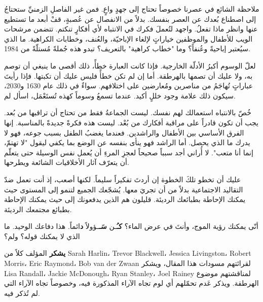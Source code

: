 \documentclass[a4paper]{article}%
\begin{document}
ملاحظة الشائع في عصرنا خصوصاً تحتاج إلى جهدٍ واعٍ. فمن غير الفاصلِ الزمنيِّ ستحتاجُ إلى
اصطناع بُعدك عن العصر بنفسك. بدلاً من الانفصال عن عُصبةٍ، قفْ أبعد ما تستطيع عنها
وانظر ماذا تفعلُ. واجهد لتُعملَ فكرك في الانتباه لأي أفكارٍ تنكتم. تتضمن مرشحات
الويب للأطفال والموظفين خياراتٍ لإلغاء الإباحيّة، والعُنف، وخطابات الكراهية. ما
الذي سيُعتبر إباحيةً وعُنفاً؟ وما "خطاب كراهية" بالتعريف؟ تبدو هذه جُملةً مُستلّةً من 1984.

لعلّ الوسوم أكبرُ الأدلّة الخارجية. فإذا كانت العبارة خطأً، ذلك أقصى ما ينبغي أن
توصم به، ولا عليك أن تصمها بالهرطقة. أما إن لم تكن خطأً فليس عليك أن تكبتها. فإذا
رأيتَ عباراتٍ تُهاجَمُ من مناصرين ومُعارضين على اختلافهم. سواءٌ في ذلك عام 1630 و2030،
سيكون ذلك علامة وجود خللٍ أكيد. عندما تسمعُ وسوماً كهذه تُستَعْمَل، اسأل لم.

خُصّ بالانتباه استعمالك لهم نفسك. ليست الجماعةُ فقط من تحتاج أن تراقبها من بُعد. يجب
أن تكون قادراً على مراقبة أفكارك من بُعْد. ليست هذه فكرةً جديدةً بالمناسبة. إنها
الفرق الأساسي بين الأطفال والراشدين. فعندما يغضبُ الطفل بسبب جوعه، فهو لا يدرك ما
الذي يحصل. أما الراشد فهو ينأى بنفسه عن الوضع بما يكفي ليقول "لا تهتمّ، إنما أنا
متعب". لا أُراني أجد سبباً صحيحاً لعجزِ المرءِ أن يُعمل نفس الوسيلة حتى يتعلّم أن يتعرّف
آثار الأخلاقيات الشائعة ويطرحها.

عليك أن تخطو تلكَ الخطوة إن أردتَ تفكيراً سليماً. لكنها أصعب، إذ أنت تعمل ضدّ
التقاليد الاجتماعية بدلاً من أن تجريَ معها. يُشجّعك الجميع لتنمو إلى المستوى حيث
يمكنك الإحاطة بطبائعك الرديئة. قليلون هم الذين يدفعونك إلى حيث يمكنك الإحاطة
بطبائع مجتمعك الرديئة.

أنّى يمكنك رؤية الموج، وأنتَ في عرض الماء؟ \textbf{كـُ}ـن
\textbf{سَـ}ـؤولاً \textbf{د}ائماً. هذا دفاعك الوحيد. ما الذي لا يمكنك قوله؟ ولم؟

\hrulefill

\textbf{يشكر} المؤلف كلاً من \textenglish{Sarah Harlin}، \textenglish{Trevor
  Blackwell}، \textenglish{Jessica Livingston}، \textenglish{Robert Morris}،
\textenglish{Eric Raymond}، \textenglish{Bob van der Zwaan} لقرائتهم مسودات هذا
المقال، ويشكر \textenglish{Lisa Randall}، \textenglish{Jackie McDonough}،
\textenglish{Ryan Stanley}، \textenglish{Joel Rainey} لمناقشتهم موضوع الهرطقة.
ويذكر عَدم تحمّلهم أي لوم تجاه الآراء المذكورة فيه، وخصوصاً تجاه الآراء التي لم
تُذكر فيه.

\printendnotes
\end{document}
